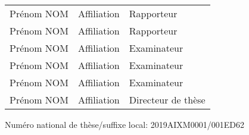 \vspace{0.4cm}
\begin{tabular}{lll}
	Prénom NOM & Affiliation & Rapporteur \\
    \vspace{0.08cm}
	Prénom NOM & Affiliation & Rapporteur \\
    \vspace{0.08cm}
	Prénom NOM & Affiliation & Examinateur \\
    \vspace{0.08cm}
	Prénom NOM & Affiliation & Examinateur \\
    \vspace{0.08cm}
	Prénom NOM & Affiliation & Examinateur \\
    \vspace{0.08cm}
	Prénom NOM & Affiliation & Directeur de thèse \\
\end{tabular}

\vspace{0.4cm}
\begin{flushleft}\normalsize Numéro national de thèse/suffixe local: 2019AIXM0001/001ED62\\\end{flushleft}
\selectfont{}
